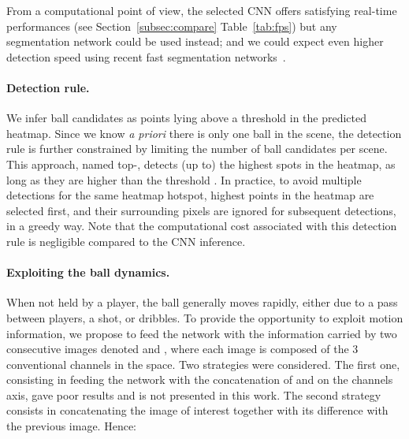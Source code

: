 \documentclass[sigconf, screen]{acmart}
\begin{document}
From a computational point of view, the selected CNN offers satisfying real-time performances (see Section~\ref{subsec:compare} Table~\ref{tab:fps}) but any segmentation network could be used instead; and we could expect even higher detection speed using recent fast segmentation networks~\cite{Yu2018,Mazzini2019,Poudel2019}.

\paragraph{Detection rule.}
We infer ball candidates as points lying above a threshold  in the predicted heatmap. Since we know {\it a priori} there is only one ball in the scene, the detection rule is further constrained by limiting the number of ball candidates per scene. This approach, named top-, detects (up to) the  highest spots in the heatmap, as long as they are higher than the threshold . In practice, to avoid multiple detections for the same heatmap hotspot, highest points in the heatmap are selected first, and their surrounding pixels are ignored for subsequent detections, in a greedy way.
Note that the computational cost associated with this detection rule is negligible compared to the CNN inference.

\paragraph{Exploiting the ball dynamics.}
When not held by a player, the ball generally moves rapidly, either due to a pass between players, a shot, or dribbles. To provide the opportunity to exploit motion information, we propose to feed the network with the information carried by two consecutive images denoted  and , where each image is composed of the 3 conventional channels in the  space.
Two strategies were considered. The first one, consisting in feeding the network with the concatenation of  and  on the channels axis, gave poor results and is not presented in this work. The second strategy consists in concatenating the image of interest together with its difference with the previous image. Hence:
\end{document}
